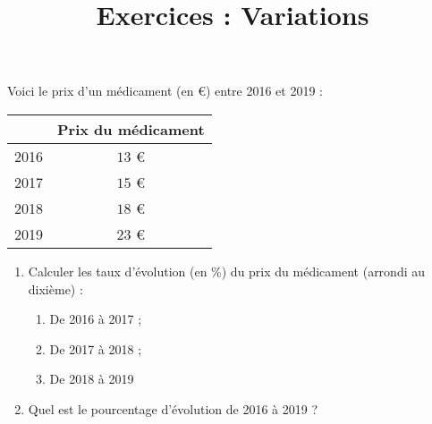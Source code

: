 \documentclass[
	classe=$2^{de}$,
]{exercice}
\title{Exercices : Variations}
\begin{document}
\maketitle

Voici le prix d'un médicament (en €) entre 2016 et 2019 :
\begin{center}
	\begin{tabular}{|l|c|}
		\hline
		     & Prix du médicament \\ \hline
		2016 & $13$ €             \\ \hline
		2017 & $15$ €             \\ \hline
		2018 & $18$ €             \\ \hline
		2019 & $23$ €             \\ \hline
	\end{tabular}
\end{center}

\begin{exercice}
	\begin{enumerate}
		\item Calculer les taux d'évolution (en \%) du prix du médicament (arrondi au dixième) :
		      \begin{enumerate}
			      \item De 2016 à 2017 ; 
			      \item De 2017 à 2018 ; 
			      \item De 2018 à 2019 
		      \end{enumerate}
		\item Quel est le pourcentage d'évolution de 2016 à 2019 ? 
	\end{enumerate}
\end{exercice}
\end{document}
